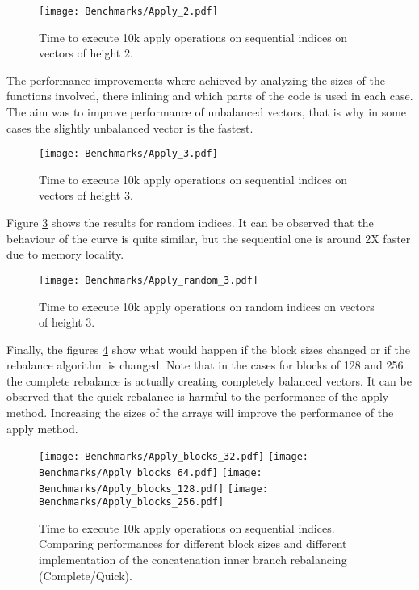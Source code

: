 \begin{figure}[h!]
  \centering
  \texttt{[image: Benchmarks/Apply\_2.pdf]}
  \caption{Time to execute 10k apply operations on sequential indices on vectors of height 2.}
   \label{ApplyBenchmarks2}
\end{figure}

The performance improvements where achieved by analyzing  the sizes of the functions involved, there inlining and which parts of the code is used in each case. The aim was to improve performance of unbalanced vectors, that is why in some cases the slightly unbalanced vector is the fastest. 

\begin{figure}[h!]
  \centering
  \texttt{[image: Benchmarks/Apply\_3.pdf]}
  \caption{Time to execute 10k apply operations on sequential indices on vectors of height 3.}
   \label{ApplyBenchmarks3}
\end{figure}

\FloatBarrier

Figure \ref{ApplyRandomBenchmarks} shows the results for random indices. It can be observed that the behaviour of the curve is quite similar, but the sequential one is around 2X faster due to memory locality.

\begin{figure}[h!]
  \centering
  \texttt{[image: Benchmarks/Apply\_random\_3.pdf]}
  \caption{Time to execute 10k apply operations on random indices on vectors of height 3.}
  \label{ApplyRandomBenchmarks}
\end{figure}

\FloatBarrier

Finally, the figures \ref{ApplyBlocksBenchmarks} show what would happen if the block sizes changed or if the rebalance algorithm is changed. Note that in the cases for blocks of 128 and 256 the complete rebalance is actually creating completely balanced vectors. It can be observed that the quick rebalance is harmful to the performance of the apply method. Increasing the sizes of the arrays will improve the performance of the apply method.

\begin{figure}[h!]
  \centering
  \texttt{[image: Benchmarks/Apply\_blocks\_32.pdf]}
  \texttt{[image: Benchmarks/Apply\_blocks\_64.pdf]}
  \texttt{[image: Benchmarks/Apply\_blocks\_128.pdf]}
  \texttt{[image: Benchmarks/Apply\_blocks\_256.pdf]}
   \caption{Time to execute 10k apply operations on sequential indices. Comparing performances for different block sizes and different implementation of the concatenation inner branch rebalancing (Complete/Quick).}
  \label{ApplyBlocksBenchmarks}
\end{figure}

